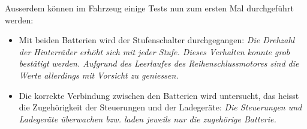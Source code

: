 Ausserdem können im Fahrzeug einige Tests nun zum ersten Mal durchgeführt werden: \begin{itemize}
	\item Mit beiden Batterien wird der Stufenschalter durchgegangen: \textit{Die Drehzahl der Hinterräder erhöht sich mit jeder Stufe. Dieses Verhalten konnte grob bestätigt werden. Aufgrund des Leerlaufes des Reihenschlussmotores sind die Werte allerdings mit Vorsicht zu geniessen.}
	\item Die korrekte Verbindung zwischen den Batterien wird untersucht, das heisst die Zugehörigkeit der Steuerungen und der Ladegeräte: \textit{Die Steuerungen und Ladegeräte überwachen bzw. laden jeweils nur die zugehörige Batterie.}
\end{itemize}



\color{black}
